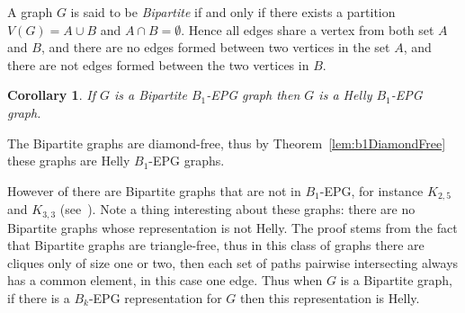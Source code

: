 \documentclass[9pt]{entcs}
\newtheorem{coro}{Corollary}[section]
\begin{document}




A graph $G$ is said to be \textit{Bipartite} if and only if there exists a partition $V(G)=A\cup B$ and $A\cap B=\emptyset$. Hence all edges share a vertex from both set $A$ and $B$, and there are no edges formed between two vertices in the set $A$, and there are not edges formed between the two vertices in $B$.


\begin{coro}
If $G$ is a Bipartite $B_1$-EPG graph then $G$ is a Helly $B_1$-EPG graph.
\end{coro}

\begin{pf}
The Bipartite graphs are diamond-free, thus by Theorem~\ref{lem:b1DiamondFree} these graphs are Helly $B_1$-EPG graphs.
\end{pf}

However of there are Bipartite graphs that are not in $B_1$-EPG, for instance $K_{2,5}$ and $K_{3,3}$ (see~\cite{cohen2014}). Note a thing interesting about these graphs: there are no Bipartite graphs whose representation is not Helly. The  proof stems from the fact that Bipartite graphs are triangle-free, thus in this class of graphs there are cliques only of size one or two, then each set of paths pairwise intersecting always has a common element, in this case one edge. Thus when $G$ is a Bipartite graph, if there is a $B_k$-EPG representation for $G$ then this representation is Helly. 
\end{document}
